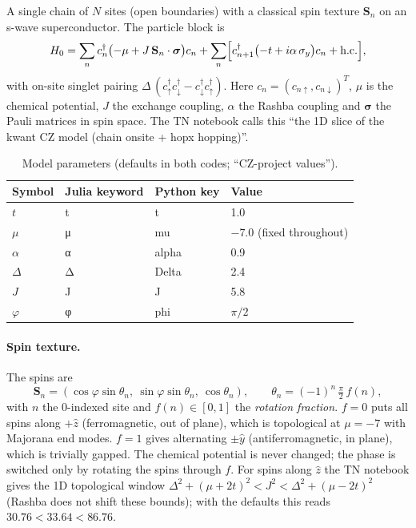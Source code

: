 \documentclass[11pt]{article}
\newcommand{\codeus}{\textunderscore\allowbreak}
\renewcommand{\code}[1]{{\ttfamily\let\_\codeus #1}}
\begin{document}
A single chain of $N$ sites (open boundaries) with a classical spin texture $\mathbf S_n$ on an s-wave superconductor. The particle block is
\[
H_0=\sum_n c_n^\dagger\bigl(-\mu+J\,\mathbf S_n\cdot\boldsymbol\sigma\bigr)c_n
+\sum_n\Bigl[c_{n+1}^\dagger\bigl(-t+i\alpha\,\sigma_y\bigr)c_n+\text{h.c.}\Bigr],
\]
with on-site singlet pairing $\Delta\,(c_\uparrow^\dagger c_\downarrow^\dagger-c_\downarrow^\dagger c_\uparrow^\dagger)$. Here $c_n=(c_{n\uparrow},c_{n\downarrow})^T$, $\mu$ is the chemical potential, $J$ the exchange coupling, $\alpha$ the Rashba coupling and $\boldsymbol\sigma$ the Pauli matrices in spin space. The TN notebook calls this ``the 1D slice of the kwant CZ model (\code{chain} onsite + \code{hop\_x} hopping)''.

\begin{table}[H]
\centering
\caption{Model parameters (defaults in both codes; ``CZ-project values'').}
\begin{tabular}{llll}
\toprule
Symbol & Julia keyword & Python key & Value\\
\midrule
$t$ & \code{t} & \code{t} & 1.0\\
$\mu$ & \code{μ} & \code{mu} & $-7.0$ (fixed throughout)\\
$\alpha$ & \code{α} & \code{alpha} & 0.9\\
$\Delta$ & \code{Δ} & \code{Delta} & 2.4\\
$J$ & \code{J} & \code{J} & 5.8\\
$\varphi$ & \code{φ} & \code{phi} & $\pi/2$\\
\bottomrule
\end{tabular}
\end{table}

\paragraph{Spin texture.} The spins are
\[
\mathbf S_n=(\cos\varphi\sin\theta_n,\ \sin\varphi\sin\theta_n,\ \cos\theta_n),\qquad
\theta_n=(-1)^n\,\tfrac{\pi}{2}\,f(n),
\]
with $n$ the 0-indexed site and $f(n)\in[0,1]$ the \emph{rotation fraction}. $f=0$ puts all spins along $+\hat z$ (ferromagnetic, out of plane), which is topological at $\mu=-7$ with Majorana end modes. $f=1$ gives alternating $\pm\hat y$ (antiferromagnetic, in plane), which is trivially gapped. The chemical potential is never changed; the phase is switched only by rotating the spins through $f$. For spins along $\hat z$ the TN notebook gives the 1D topological window $\Delta^2+(\mu+2t)^2<J^2<\Delta^2+(\mu-2t)^2$ (Rashba does not shift these bounds); with the defaults this reads $30.76<33.64<86.76$.
\end{document}
